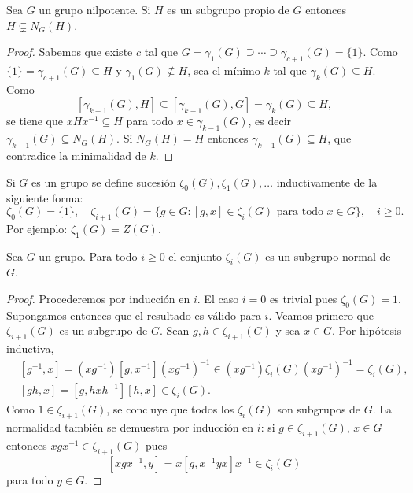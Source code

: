 \begin{lemma}
	\label{lemma:normalizadora}
	Sea $G$ un grupo nilpotente. Si $H$ es un subgrupo propio de $G$ entonces
	$H\subsetneq N_G(H)$.
\end{lemma}

\begin{proof}
	Sabemos que existe $c$ tal que $G=\gamma_1(G)\supseteq\cdots\supseteq\gamma_{c+1}(G)=\{1\}$. Como 
	$\{1\}=\gamma_{c+1}(G)\subseteq H$ y $\gamma_1(G)\not\subseteq H$, 
	sea el mínimo $k$ tal que $\gamma_k(G)\subseteq H$. Como
	\[
		[\gamma_{k-1}(G),H]\subseteq [\gamma_{k-1}(G),G]=\gamma_k(G)\subseteq H,
	\]
	se tiene que 
	$xHx^{-1}\subseteq H$ para todo $x\in\gamma_{k-1}(G)$,
	es decir $\gamma_{k-1}(G)\subseteq N_G(H)$. Si $N_G(H)=H$ entonces
	$\gamma_{k-1}(G)\subseteq H$, que contradice la minimalidad de $k$. 
\end{proof}



Si $G$ es un grupo se define sucesión $\zeta_0(G),\zeta_1(G),\dots$
inductivamente de la siguiente forma:
\[
	\zeta_0(G)=\{1\},\quad
	\zeta_{i+1}(G)=\{g\in G:[g,x]\in\zeta_{i}(G)\text{ para todo $x\in G$}\},\quad i\geq 0.
\]
Por ejemplo: $\zeta_1(G)=Z(G)$.

\begin{lemma}
	\label{lemma:central_ascendente}
	Sea $G$ un grupo. Para todo $i\geq0$ el conjunto $\zeta_i(G)$ es un
	subgrupo normal de $G$. 
\end{lemma}

\begin{proof}
	Procederemos por inducción en $i$. El caso $i=0$ es trivial pues
	$\zeta_0(G)=1$.  Supongamos entonces que el resultado es válido para $i$.
	Veamos primero que $\zeta_{i+1}(G)$ es un subgrupo de $G$. 
	Sean $g,h\in \zeta_{i+1}(G)$ y sea $x\in G$. Por hipótesis inductiva,
	\begin{align*}
	&[g^{-1},x]=(xg^{-1})[g,x^{-1}](xg^{-1})^{-1}\in (xg^{-1})\zeta_i(G)(xg^{-1})^{-1}=\zeta_i(G),\\
	&[gh,x]=[g,hxh^{-1}][h,x]\in \zeta_{i}(G).
	\end{align*}
	Como $1\in\zeta_{i+1}(G)$, se concluye que todos los $\zeta_i(G)$ son
	subgrupos de $G$. La normalidad también se demuestra por inducción en $i$:
	si $g\in\zeta_{i+1}(G)$, $x\in G$ entonces $xgx^{-1}\in\zeta_{i+1}(G)$ pues 
	\[
	[xgx^{-1},y]=x[g,x^{-1}yx]x^{-1}\in\zeta_{i}(G)
	\]
	para todo $y\in G$.
\end{proof}


